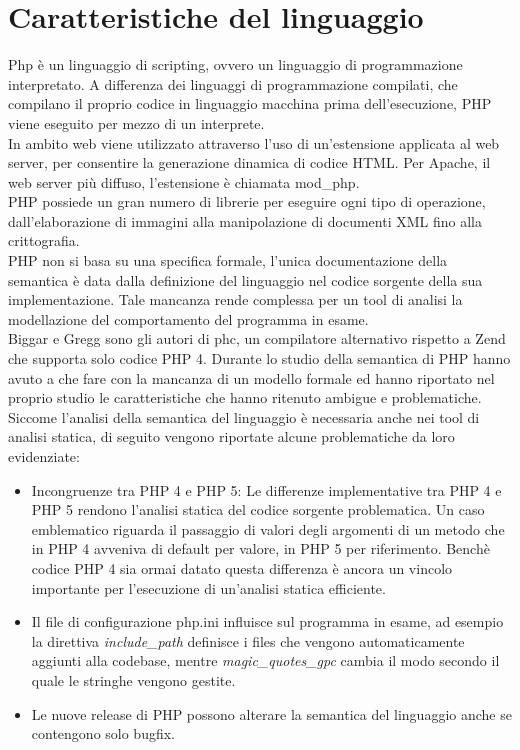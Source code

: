 \section{Caratteristiche del linguaggio}
Php è un linguaggio di scripting, ovvero un linguaggio di programmazione interpretato. A differenza dei linguaggi di programmazione compilati, che compilano il proprio codice in linguaggio macchina prima dell'esecuzione, PHP viene eseguito per mezzo di un interprete.\\
In ambito web viene utilizzato attraverso l'uso di un'estensione applicata al web server, per consentire la generazione dinamica di codice HTML. Per Apache, il web server più diffuso, l'estensione è chiamata mod\_php.\\
PHP possiede un gran numero di librerie per eseguire ogni tipo di operazione, dall'elaborazione di immagini alla manipolazione di documenti XML fino alla crittografia.\\
PHP non si basa su una specifica formale, l'unica documentazione della semantica è data dalla definizione del linguaggio nel codice sorgente della sua implementazione. Tale mancanza rende complessa per un tool di analisi la modellazione del comportamento del programma in esame.\\
Biggar e Gregg\cite{CITAZIONE DI PHC PAPER} sono gli autori di phc, un compilatore alternativo rispetto a Zend che supporta solo codice PHP 4. Durante lo studio della semantica di PHP hanno avuto a che fare con la mancanza di un modello formale ed hanno riportato nel proprio studio le caratteristiche che hanno ritenuto ambigue e problematiche. Siccome l'analisi della semantica del linguaggio è necessaria anche nei tool di analisi statica, di seguito vengono riportate alcune problematiche da loro evidenziate:
\begin{itemize}
\item Incongruenze tra PHP 4 e PHP 5: Le differenze implementative tra PHP 4 e PHP 5 rendono l'analisi statica del codice sorgente problematica. Un caso emblematico riguarda il passaggio di valori degli argomenti di un metodo che in PHP 4 avveniva di default per valore, in PHP 5 per riferimento. Benchè codice PHP 4 sia ormai datato questa differenza è ancora un vincolo importante per l'esecuzione di un'analisi statica efficiente.
\item Il file di configurazione php.ini influisce sul programma in esame, ad esempio la direttiva \emph{include\_path} definisce i files che vengono automaticamente aggiunti alla codebase, mentre \emph{magic\_quotes\_gpc} cambia il modo secondo il quale le stringhe vengono gestite.
\item Le nuove release di PHP possono alterare la semantica del linguaggio anche se contengono solo bugfix.
\end{itemize}

